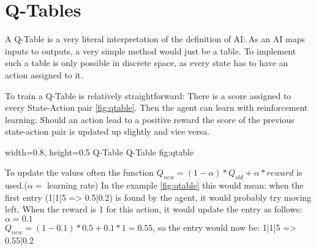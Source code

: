 \section{Q-Tables}
\label{sec:QTable}
A Q-Table is a very literal interpretation of the definition of AI: As an AI maps inputs to outputs, a very simple method would just be a table. To implement such a table is only possible in discrete space, as every state has to have an action assigned to it.

To train a Q-Table is relatively straightforward: There is a score assigned to every State-Action pair \ref{fig:qtable}. Then the agent can learn with reinforcement learning: Should an action lead to a positive reward the score of the previous state-action pair is updated up slightly and vice versa.

    {width=0.8\textwidth, height=0.5\textheight} %
    {Q-Table}   %
    {Q-Table}   %
    {fig:qtable}    %

To update the values often the function $Q_{new}=(1-\alpha)*Q_{old}+\alpha*reward$ is used.($\alpha=$ learning rate)
In the example \ref{fig:qtable} this would mean: when the first entry (1|1|5 => 0.5|0.2) is found by the agent, it would probably try moving left. When the reward is 1 for this action, it would update the entry as follows: $\alpha=0.1$\\$Q_{new}=(1-0.1)*0.5+0.1*1=0.55$, so the entry would now be: 1|1|5 => 0.55|0.2

